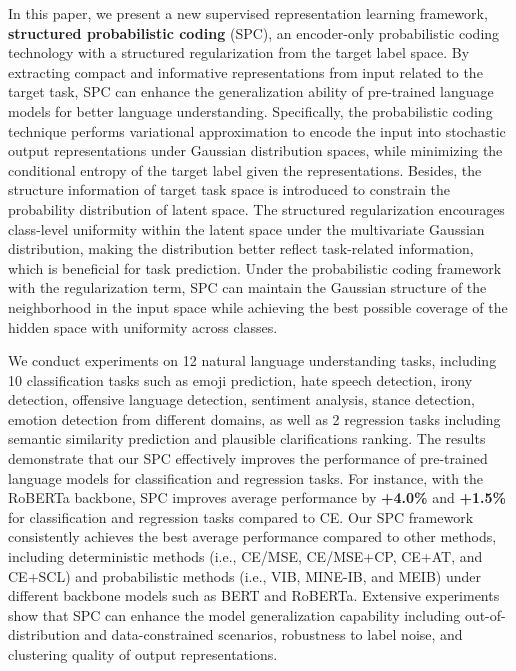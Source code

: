 \documentclass[letterpaper]{article} %
\begin{document}
In this paper, we present a new supervised representation learning framework, \textbf{structured probabilistic coding} (SPC), an encoder-only probabilistic coding technology with a structured regularization from the target label space. By extracting compact and informative representations from input related to the target task, SPC can enhance the generalization ability of pre-trained language models for better language understanding.
Specifically, the probabilistic coding technique performs variational approximation to encode the input into stochastic output representations under Gaussian distribution spaces, while minimizing the conditional entropy of the target label given the representations.
Besides, the structure information of target task space is introduced to constrain the probability distribution of latent space.
The structured regularization encourages class-level uniformity within the latent space under the multivariate Gaussian distribution, making the distribution better reflect task-related information, which is beneficial for task prediction.
Under the probabilistic coding framework with the regularization term, SPC can maintain the Gaussian structure of the neighborhood in the input space while achieving the best possible coverage of the hidden space with uniformity across classes.


We conduct experiments on 12 natural language understanding tasks, including 10 classification tasks such as emoji prediction, hate speech detection, irony detection, offensive language detection, sentiment analysis, stance detection, emotion detection from different domains, as well as 2 regression tasks including semantic similarity prediction and plausible clarifications ranking. The results demonstrate that our SPC effectively improves the performance of pre-trained language models for classification and regression tasks. For instance, with the RoBERTa backbone, SPC improves average performance by \textbf{+4.0\%} and \textbf{+1.5\%} for classification and regression tasks compared to CE. Our SPC framework consistently achieves the best average performance compared to other methods, including deterministic methods (i.e., CE/MSE, CE/MSE+CP, CE+AT, and CE+SCL) and probabilistic methods (i.e., VIB, MINE-IB, and MEIB)
under different backbone models such as BERT and RoBERTa. Extensive experiments show that SPC can enhance the model generalization capability including out-of-distribution and data-constrained scenarios, robustness to label noise, and clustering quality of output representations.
\end{document}
